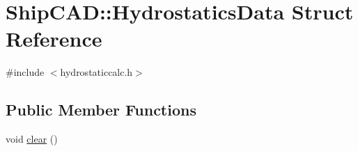 \hypertarget{structShipCAD_1_1HydrostaticsData}{\section{Ship\-C\-A\-D\-:\-:Hydrostatics\-Data Struct Reference}
\label{structShipCAD_1_1HydrostaticsData}
}


{\ttfamily \#include $<$hydrostaticcalc.\-h$>$}

\subsection*{Public Member Functions}
\begin{DoxyCompactItemize}
\item 
void \hyperlink{structShipCAD_1_1HydrostaticsData_a7ea81ac589a3b24424b4176c734c7a37}{clear} ()
\end{DoxyCompactItemize}
